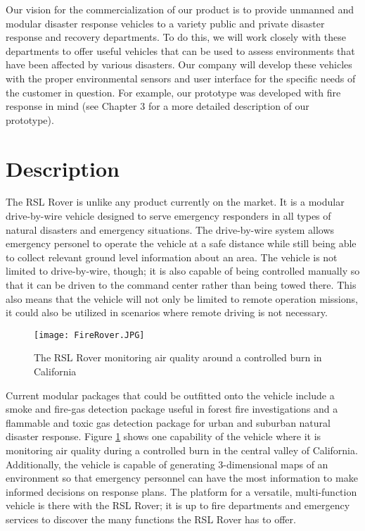 Our vision for the commercialization of our product is to provide unmanned and modular disaster response vehicles to a variety public and private disaster response and recovery departments. To do this, we will work closely with these departments to offer useful vehicles that can be used to assess environments that have been affected by various disasters. Our company will develop these vehicles with the proper environmental sensors and user interface for the specific needs of the customer in question. For example, our prototype was developed with fire response in mind (see Chapter 3 for a more detailed description of our prototype). 

\section{Description}

The RSL Rover is unlike any product currently on the market. It is a modular drive-by-wire vehicle designed to serve emergency responders in all types of natural disasters and emergency situations. The drive-by-wire system allows emergency personel to operate the vehicle at a safe distance while still being able to collect relevant ground level information about an area. The vehicle is not limited to drive-by-wire, though; it is also capable of being controlled manually so that it can be driven to the command center rather than being towed there. This also means that the vehicle will not only be limited to remote operation missions, it could also be utilized in scenarios where remote driving is not necessary.\newline

\begin{figure}[h!]
	\begin{center}
		\texttt{[image: FireRover.JPG]}
		\caption{The RSL Rover monitoring air quality around a controlled burn in California}
		\label{fig:FireRover}
	\end{center}
\end{figure}

Current modular packages that could be outfitted onto the vehicle include a smoke and fire-gas detection package useful in forest fire investigations and a flammable and toxic gas detection package for urban and suburban natural disaster response. Figure \ref{fig:FireRover} shows one capability of the vehicle where it is monitoring air quality during a controlled burn in the central valley of California. Additionally, the vehicle is capable of generating 3-dimensional maps of an environment so that emergency personnel can have the most information to make informed decisions on response plans. The platform for a versatile, multi-function vehicle is there with the RSL Rover; it is up to fire departments and emergency services to discover the many functions the RSL Rover has to offer.

